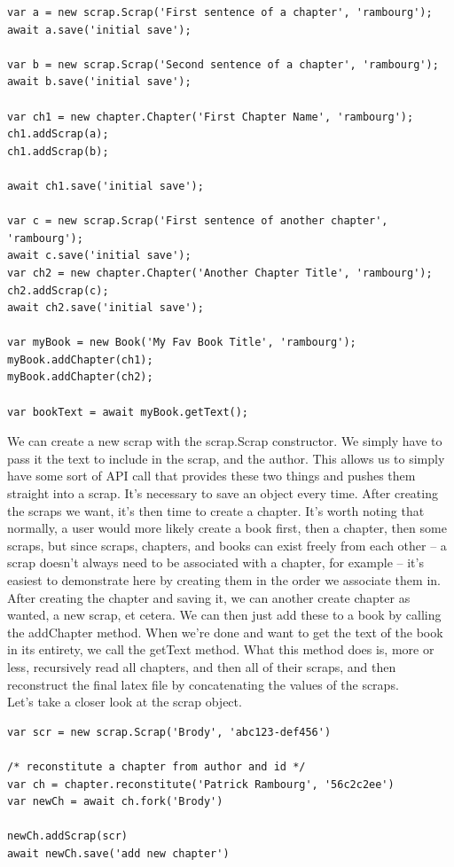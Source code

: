 \documentclass[onecolumn, draftclsnofoot,10pt, compsoc]{IEEEtran}
\begin{document}
\begin{lstlisting}
var a = new scrap.Scrap('First sentence of a chapter', 'rambourg');
await a.save('initial save');

var b = new scrap.Scrap('Second sentence of a chapter', 'rambourg');
await b.save('initial save');

var ch1 = new chapter.Chapter('First Chapter Name', 'rambourg');
ch1.addScrap(a);
ch1.addScrap(b);

await ch1.save('initial save');

var c = new scrap.Scrap('First sentence of another chapter', 'rambourg');
await c.save('initial save');
var ch2 = new chapter.Chapter('Another Chapter Title', 'rambourg');
ch2.addScrap(c);
await ch2.save('initial save');

var myBook = new Book('My Fav Book Title', 'rambourg');
myBook.addChapter(ch1);
myBook.addChapter(ch2);

var bookText = await myBook.getText();
\end{lstlisting}

\noindent We can create a new scrap with the scrap.Scrap constructor. We simply have
to pass it the text to include in the scrap, and the author. This allows us to
simply have some sort of API call that provides these two things and pushes them
straight into a scrap. It's necessary to save an object every time. After
creating the scraps we want, it's then time to create a chapter. It's worth
noting that normally, a user would more likely create a book first, then a
chapter, then some scraps, but since scraps, chapters, and books can exist
freely from each other -- a scrap doesn't always need to be associated with a
chapter, for example -- it's easiest to demonstrate here by creating them in the
order we associate them in. \\

\noindent After creating the chapter and saving it, we can
another create chapter as wanted, a new scrap, et cetera. We can then
just add these to a book by calling the addChapter method. When we're done and
want to get the text of the book in its entirety, we call the getText method.
What this method does is, more or less, recursively read all chapters, and then
all of their scraps, and then reconstruct the final latex file by concatenating
the values of the scraps.\\
\newpage
\noindent Let's take a closer look at the scrap object.

\begin{lstlisting}
var scr = new scrap.Scrap('Brody', 'abc123-def456')

/* reconstitute a chapter from author and id */
var ch = chapter.reconstitute('Patrick Rambourg', '56c2c2ee')
var newCh = await ch.fork('Brody')

newCh.addScrap(scr)
await newCh.save('add new chapter')
\end{lstlisting} 
\end{document}

